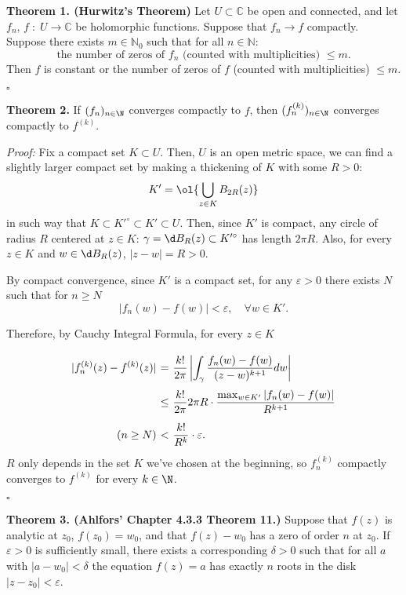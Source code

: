 
\textbf{Theorem 1. (Hurwitz's Theorem)} Let \( U \subset \mathbb{C} \) be open and connected, and let \( f_n,\, f \;:\; U \to \mathbb{C} \) be holomorphic functions. Suppose that \( f_n \to f \) compactly. Suppose there exists \( m \in \mathbb{N}_0 \) such that for all \( n \in \mathbb{N} \):
\[ \text{the number of zeros of } f_n \text{ (counted with multiplicities) } \leq m. \]
Then \( f \) is constant or the number of zeros of \( f \) (counted with multiplicities) \( \leq m \).

$ $\hfill $\square$

\textbf{Theorem 2.} If $(f_n)_{n\in\N}$ converges compactly to $f$, then $(f_{n}^{(k)})_{n\in\N}$ converges compactly to $f^{(k)}$.

\textit{Proof:} Fix a compact set $K\subset U$. Then, $U$ is an open metric space, we can find a slightly larger compact set by making a thickening of $K$ with some $R > 0$:
\[ K' = \ol{\bigcup_{z\in K} B_{2R}(z)} \]
in such way that $K \subset K'^\circ \subset K' \subset U$. Then, since $K'$ is compact, any circle of radius $R$ centered at $z \in K$: $\gamma = \d B_R(z) \subset K'^{\circ}$ has length $2\pi R$. Also, for every $z \in K$ and $w \in \d B_R(z)$, $|z-w| = R > 0$.

By compact convergence, since $K'$ is a compact set, for any $\varepsilon > 0$ there exists $N$ such that for $n \geq N$
\[ |f_{n}(w) - f(w)| < \varepsilon,\hspace{1em}  \forall w \in K'.\]

Therefore, by Cauchy Integral Formula, for every $z \in K$
\[ \everymath{\displaystyle}
\arraycolsep=1.8pt\def\arraystretch{2.5}
\begin{array}{rcl}
    |f^{(k)}_{n}(z) - f^{(k)}(z)| & = & \frac{k!}{2\pi}\left| \int_{\gamma} \frac{f_{n}(w) - f(w)}{(z-w)^{k+1}} dw\right|\\
    & \leq & \frac{k!}{2\pi} 2\pi R \cdot \frac{\max_{w\in K'}|f_{n}(w) - f(w)|}{R^{k+1}}\\
    (n\geq N) & < & \frac{k!}{R^k} \cdot \varepsilon.
\end{array} \]
$R$ only depends in the set $K$ we've chosen at the beginning, so $f^{(k)}_{n}$ compactly converges to $f^{(k)}$ for every $k \in \N$.

$ $\hfill $\square$

\textbf{Theorem 3. (Ahlfors' Chapter 4.3.3 Theorem 11.)} Suppose that \( f(z) \) is analytic at \( z_0 \), \( f(z_0) = w_0 \), and that \( f(z) - w_0 \) has a zero of order \( n \) at \( z_0 \). If \( \varepsilon > 0 \) is sufficiently small, there exists a corresponding \( \delta > 0 \) such that for all \( a \) with \( |a - w_0| < \delta \) the equation \( f(z) = a \) has exactly \( n \) roots in the disk \( |z - z_0| < \varepsilon \).

